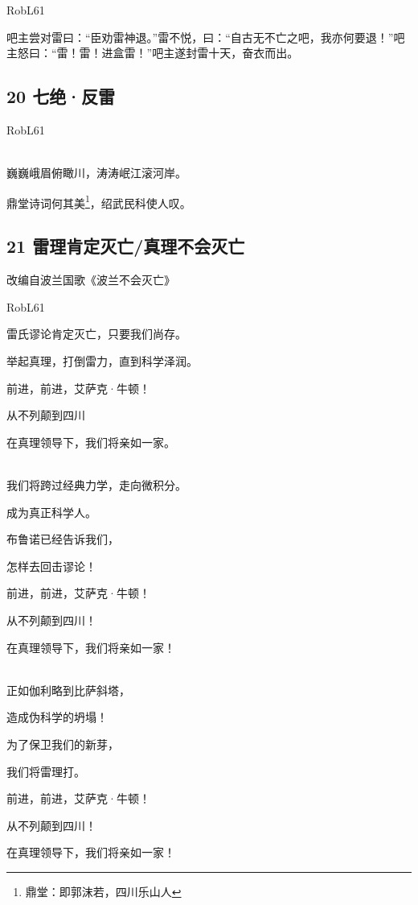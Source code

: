 RobL61

吧主尝对雷曰：``臣劝雷神退。''雷不悦，曰：``自古无不亡之吧，我亦何要退！''吧主怒曰：``雷！雷！进盒雷！''吧主遂封雷十天，奋衣而出。

\hypertarget{ux4e03ux7eddux53cdux96f7}{%
\subsection{20 七绝·反雷}\label{ux4e03ux7eddux53cdux96f7}}

RobL61

~\\
巍巍峨眉俯瞰川，涛涛岷江滚河岸。

鼎堂诗词何其美\footnote{鼎堂：即郭沫若，四川乐山人}，绍武民科使人叹。

\hypertarget{ux96f7ux7406ux80afux5b9aux706dux4ea1ux771fux7406ux4e0dux4f1aux706dux4ea1}{%
\subsection{21
雷理肯定灭亡/真理不会灭亡}\label{ux96f7ux7406ux80afux5b9aux706dux4ea1ux771fux7406ux4e0dux4f1aux706dux4ea1}}

改编自波兰国歌《波兰不会灭亡》

RobL61

雷氏谬论肯定灭亡，只要我们尚存。

举起真理，打倒雷力，直到科学泽润。

前进，前进，艾萨克·牛顿！

从不列颠到四川

在真理领导下，我们将亲如一家。

~\\
我们将跨过经典力学，走向微积分。

成为真正科学人。

布鲁诺已经告诉我们，

怎样去回击谬论！

前进，前进，艾萨克·牛顿！

从不列颠到四川！

在真理领导下，我们将亲如一家！

~\\
正如伽利略到比萨斜塔，

造成伪科学的坍塌！

为了保卫我们的新芽，

我们将雷理打。

前进，前进，艾萨克·牛顿！

从不列颠到四川！

在真理领导下，我们将亲如一家！

